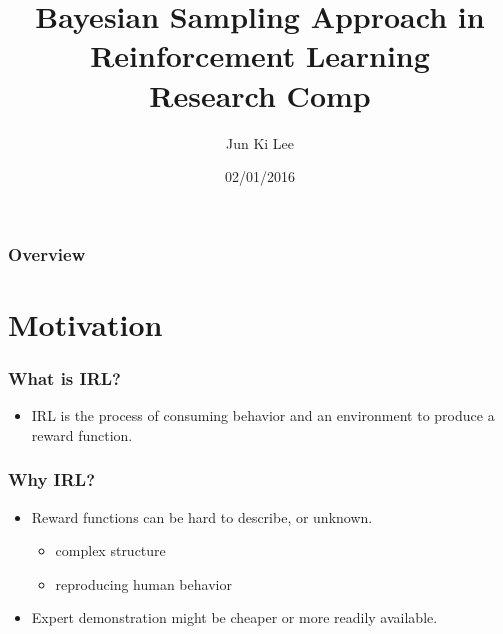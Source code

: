 \documentclass{beamer}
\title[Short Title]{Bayesian Sampling Approach in \\ Reinforcement Learning\\\small Research Comp} %
\author{ Jun Ki Lee } %
\institute[Brown CS] %
{
Brown University \\ %
}
\date{02/01/2016} %
\begin{document}
\begin{frame}
\titlepage %
\end{frame}

\begin{frame}
\frametitle{Overview} %
\tableofcontents %
\end{frame}



\section{Motivation}

\begin{frame}
\frametitle{What is IRL?}
\begin{itemize}
\item IRL is the process of consuming behavior and an environment to produce a reward function.
\end{itemize}

\end{frame}

\begin{frame}
\frametitle{Why IRL?}
\begin{itemize}
\item Reward functions can be hard to describe, or unknown. 
\begin{itemize}
\item complex structure
\item reproducing human behavior
\end{itemize}
\item Expert demonstration might be cheaper or more readily available.
\end{itemize}
\end{frame}

\end{document}
